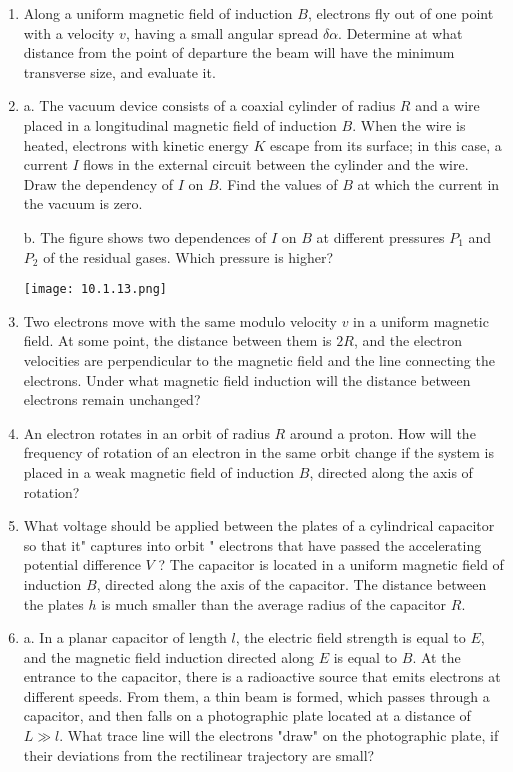 \documentclass{article}
\begin{document}
\begin{enumerate}[label=10.1.\arabic*]
\item Along a uniform magnetic field of induction $B$, electrons fly out of one point with a velocity $v$, having a small angular spread $\delta \alpha$. Determine at what distance from the point of departure the beam will have the minimum transverse size, and evaluate it.

\item a. The vacuum device consists of a coaxial cylinder of radius $R$ and a wire placed in a longitudinal magnetic field of induction $B$. When the wire is heated, electrons with kinetic energy $K$ escape from its surface; in this case, a current $I$ flows in the external circuit between the cylinder and the wire. Draw the dependency of $I$ on $B$. Find the values of $B$ at which the current in the vacuum is zero. 

b. The figure shows two dependences of $I$ on $B$ at different pressures $P_1$ and $P_2$ of the residual gases. Which pressure is higher?

\begin{center}
    \texttt{[image: 10.1.13.png]}
\end{center}

\item Two electrons move with the same modulo velocity $v$ in a uniform magnetic field. At some point, the distance between them is $2R$, and the electron velocities are perpendicular to the magnetic field and the line connecting the electrons. Under what magnetic field induction will the distance between electrons remain unchanged?

\item An electron rotates in an orbit of radius $R$ around a proton. How will the frequency of rotation of an electron in the same orbit change if the system is placed in a weak magnetic field of induction $B$, directed along the axis of rotation?

\item What voltage should be applied between the plates of a cylindrical capacitor so that it" captures into orbit " electrons that have passed the accelerating potential difference $V$ ? The capacitor is located in a uniform magnetic field of induction $B$, directed along the axis of the capacitor. The distance between the plates $h$ is much smaller than the average radius of the capacitor $R$.

\item a. In a planar capacitor of length $l$, the electric field strength is equal to $E$, and the magnetic field induction directed along $E$ is equal to $B$. At the entrance to the capacitor, there is a radioactive source that emits electrons at different speeds. From them, a thin beam is formed, which passes through a capacitor, and then falls on a photographic plate located at a distance of $L \gg l$. What trace line will the electrons "draw" on the photographic plate, if their deviations from the rectilinear trajectory are small?


\end{enumerate}
\end{document}
